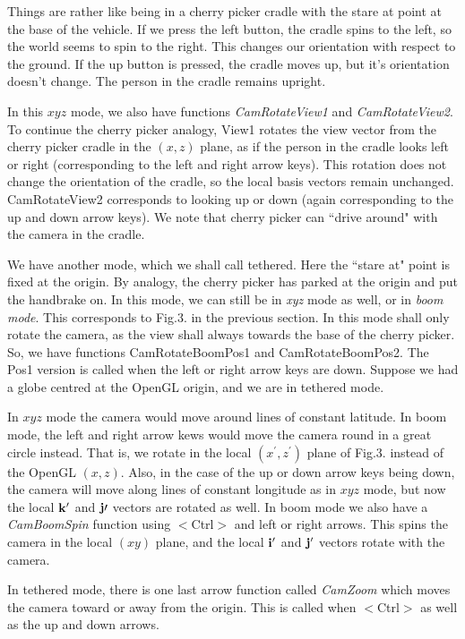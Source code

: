 \documentclass[12pt]{article}
\begin{document}
Things are rather like being in a cherry picker cradle with the stare at point
at the base of the vehicle. If we press the left button,  the cradle spins
to the left, so the world seems to spin to the right. This changes our orientation
with respect to the ground. If the up button is pressed, the cradle moves up,
but it's orientation doesn't change. The person in the cradle remains upright.

In this $xyz$ mode, we also have functions {\it CamRotateView1} and
 {\it CamRotateView2}. 
To continue the cherry picker analogy, View1 rotates the view vector from the 
cherry picker cradle in the $(x,z)$ plane, as if the person in the cradle
looks left or right (corresponding to the left and right arrow keys). 
This rotation does not change the orientation of the cradle, so the
local basis vectors remain unchanged. CamRotateView2 corresponds
to looking up or down (again corresponding to the up and down arrow keys).
We note that cherry picker can ``drive around" with the camera in the cradle.

We have another mode, which we shall call {tethered}. Here the ``stare at" point
is fixed at the origin. By analogy, the cherry picker has parked at the origin
and put the handbrake on.  In this mode, we can still be in {\it xyz} mode
as well, or in
{\it boom mode}. This  corresponds
to Fig.3. in the previous section. In this mode shall only rotate the camera,
as the view shall always towards the base of the cherry picker. So, we
have functions CamRotateBoomPos1 and CamRotateBoomPos2. The Pos1
version is called when the left or right arrow keys are down.
Suppose we had a globe centred at the OpenGL origin, and we are in tethered mode.

In $xyz$ mode the camera would move around lines of constant latitude. In boom
mode, the left and right arrow kews would move the camera round in a great circle
instead. That is, we rotate in the local $(x^\prime, z^\prime)$ plane of Fig.3. instead
of the OpenGL $(x,z)$. Also, in the case of the up or down arrow keys being
down, the camera will move along lines of constant longitude as in $xyz$ mode, but
now the local ${\bf k}^\prime$ and ${\bf j}\prime$ vectors are rotated as well.
In boom mode we also have a {\it CamBoomSpin} function using $<$Ctrl$>$ and 
left or right arrows. This spins the camera in the local $(xy)$ plane, and
the local ${\bf i}^\prime$ and ${\bf j}^\prime$ vectors rotate with the camera.

In tethered mode, there is one last arrow function called {\it CamZoom}
which moves the camera toward or away from the origin. This is called when 
 $<$Ctrl$>$  as well as the up and down arrows.
\end{document}
